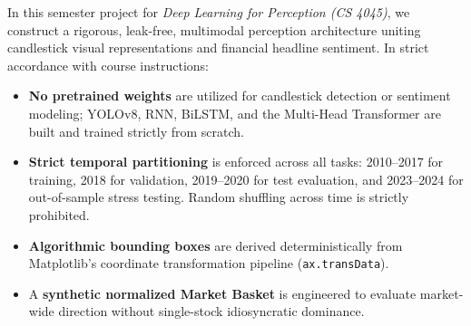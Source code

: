 \documentclass[10pt,journal]{IEEEtran}
\begin{document}
In this semester project for \textit{Deep Learning for Perception (CS 4045)}, we construct a rigorous, leak-free, multimodal perception architecture uniting candlestick visual representations and financial headline sentiment. In strict accordance with course instructions:
\begin{itemize}
  \item \textbf{No pretrained weights} are utilized for candlestick detection or sentiment modeling; YOLOv8, RNN, BiLSTM, and the Multi-Head Transformer are built and trained strictly from scratch.
  \item \textbf{Strict temporal partitioning} is enforced across all tasks: 2010--2017 for training, 2018 for validation, 2019--2020 for test evaluation, and 2023--2024 for out-of-sample stress testing. Random shuffling across time is strictly prohibited.
  \item \textbf{Algorithmic bounding boxes} are derived deterministically from Matplotlib's coordinate transformation pipeline (\texttt{ax.transData}).
  \item A \textbf{synthetic normalized Market Basket} is engineered to evaluate market-wide direction without single-stock idiosyncratic dominance.
\end{itemize}
\end{document}
